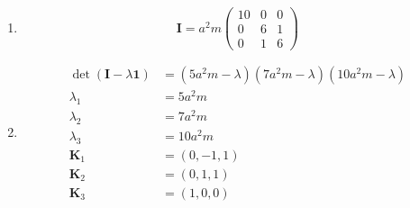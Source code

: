\documentclass{article}
\renewcommand{\vec}[1]{\boldsymbol{\mathbf{#1}}}
\begin{document}
\begin{enumerate}
  \item \[\vec{I} = a^2 m \begin{pmatrix}
            10 & 0 & 0 \\
            0  & 6 & 1 \\
            0  & 1 & 6
          \end{pmatrix}\]

  \item

        \begin{align*}
          \det (\vec{I} - \lambda \vec{1}) & = (5 a^2 m - \lambda) (7 a^2 m - \lambda) (10 a^2 m - \lambda) \\
          \lambda_1                        & = 5 a^2 m                                                      \\
          \lambda_2                        & = 7 a^2 m                                                      \\
          \lambda_3                        & = 10 a^2 m                                                     \\
          \vec{K}_1                        & = (0, -1, 1)                                                   \\
          \vec{K}_2                        & = (0, 1, 1)                                                    \\
          \vec{K}_3                        & = (1, 0, 0)
        \end{align*}
\end{enumerate}

\setcounter{subsection}{36}
\subsection{}
\end{document}
